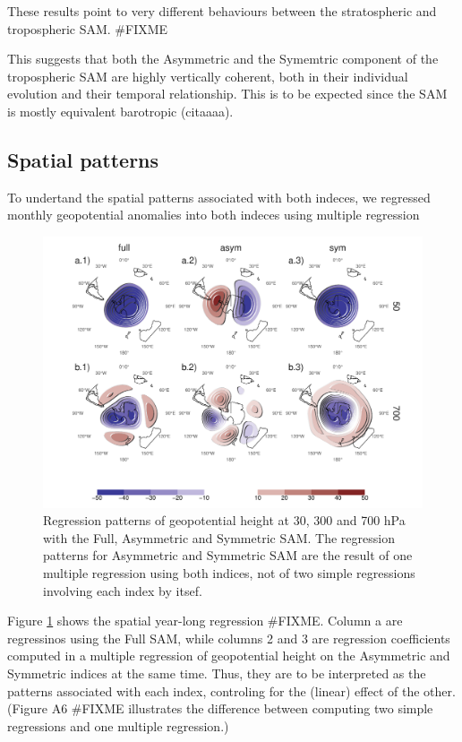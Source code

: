 \documentclass[]{ametsocV5}
\begin{document}
These results point to very different behaviours between the
stratospheric and tropospheric SAM. \#FIXME

This suggests that both the Asymmetric and the Symemtric component of
the tropospheric SAM are highly vertically coherent, both in their
individual evolution and their temporal relationship. This is to be
expected since the SAM is mostly equivalent barotropic (citaaaa).

\subsection{Spatial patterns}

To undertand the spatial patterns associated with both indeces, we
regressed monthly geopotential anomalies into both indeces using
multiple regression

\begin{figure}
\includegraphics{2d-regr-1} \caption[Regression patterns of geopotential height at 30, 300 and 700 hPa with the Full, Asymmetric and Symmetric SAM]{Regression patterns of geopotential height at 30, 300 and 700 hPa with the Full, Asymmetric and Symmetric SAM. The regression patterns for Asymmetric and Symmetric SAM are the result of one multiple regression using both indices, not of two simple regressions involving each index by itsef.}\label{fig:2d-regr}
\end{figure}

Figure \ref{fig:2d-regr} shows the spatial year-long regression \#FIXME.
Column a are regressinos using the Full SAM, while columns 2 and 3 are
regression coefficients computed in a multiple regression of
geopotential height on the Asymmetric and Symmetric indices at the same
time. Thus, they are to be interpreted as the patterns associated with
each index, controling for the (linear) effect of the other. (Figure A6
\#FIXME illustrates the difference between computing two simple
regressions and one multiple regression.)
\end{document}
